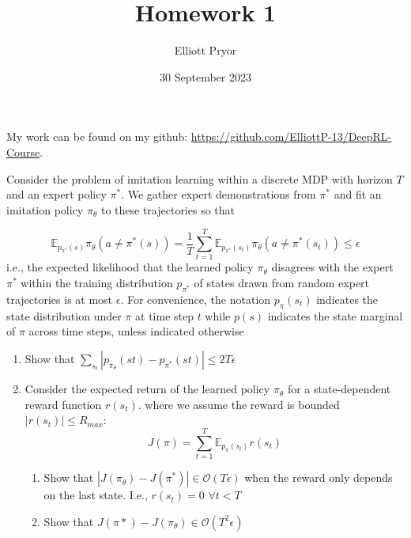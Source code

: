 \documentclass[11pt]{article}
\title{Homework 1}
\author{Elliott Pryor}
\date{30 September 2023}
\begin{document}
\maketitle

My work can be found on my github:
\href{https://github.com/ElliottP-13/DeepRL-Course/tree/main/hw1}{https://github.com/ElliottP-13/DeepRL-Course}.



Consider the problem of imitation learning within a discrete MDP with horizon $T$ and an expert
policy $\pi^*$. We gather expert demonstrations from $\pi^*$ and fit an imitation policy $\pi_\theta$ to these
trajectories so that

\begin{equation}
    \mathbb{E}_{p_{\pi^*}(s)} \pi_\theta(a \neq \pi^*(s)) = \frac{1}{T} \sum^{T}_{t=1} \mathbb{E}_{p_{\pi^*}(s_t)} \pi_\theta(a \neq \pi^*(s_t)) \leq \epsilon
\end{equation}
i.e., the expected likelihood that the learned policy $\pi_\theta$ disagrees with the expert $\pi^*$ within the
training distribution $p_{\pi^*}$ of states drawn from random expert trajectories is at most $\epsilon$.
For convenience, the notation $p_\pi (s_t)$ indicates the state distribution under $\pi$ at time step $t$ while
$p(s)$ indicates the state marginal of $\pi$ across time steps, unless indicated otherwise

\begin{enumerate}
    \item Show that $\sum_{s_t} \left| p_{\pi_\theta}(st) - p_{\pi^*}(st) \right| \leq 2T\epsilon$
    \item Consider the expected return of the learned policy $\pi_\theta$ for a state-dependent reward function $r(s_t)$.
    where we assume the reward is bounded $|r(s_t)| \leq R_{max}$:
    $$
    J(\pi) = \sum_{t=1}^T \mathbb{E}_{p_\pi(s_t)} r(s_t)
    $$
        \begin{enumerate}
            \item Show that $|J(\pi_\theta) - J(\pi^*)| \in \mathcal{O}(T\epsilon)$ when the reward only depends on the last state.
            I.e., $r(s_t) = 0$ $\forall t<T$
            \item Show that $J(\pi*) - J(\pi_\theta) \in \mathcal{O}(T^2 \epsilon)$
        \end{enumerate}
\end{enumerate}

\soln
\end{document}
